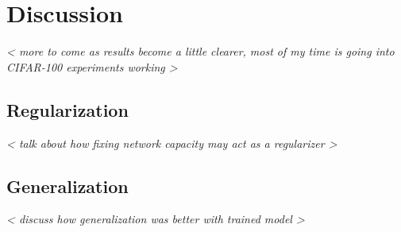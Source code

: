 \chapter{Discussion}
\emph{ < more to come as results become a little clearer, most of my time is going into CIFAR-100 experiments working > }

\section{Regularization}

\emph{ < talk about how fixing network capacity may act as a regularizer > }

\section{Generalization}
\emph{ < discuss how generalization was better with trained model > }

